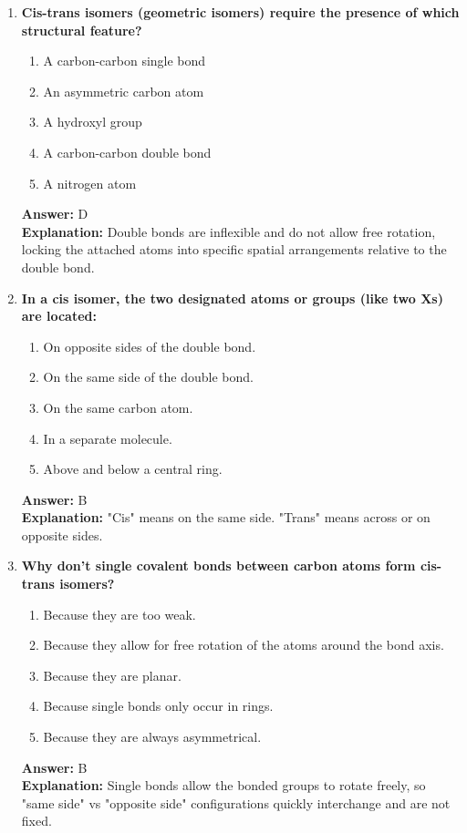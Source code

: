 \documentclass[11pt, a4paper]{article}
\begin{document}
\begin{enumerate}
\item \textbf{Cis-trans isomers (geometric isomers) require the presence of which structural feature?}
\begin{enumerate}[label=\Alph*.]
    \item A carbon-carbon single bond
    \item An asymmetric carbon atom
    \item A hydroxyl group
    \item A carbon-carbon double bond
    \item A nitrogen atom
\end{enumerate}
\textbf{Answer:} D \\
\textbf{Explanation:} Double bonds are inflexible and do not allow free rotation, locking the attached atoms into specific spatial arrangements relative to the double bond.

\item \textbf{In a cis isomer, the two designated atoms or groups (like two Xs) are located:}
\begin{enumerate}[label=\Alph*.]
    \item On opposite sides of the double bond.
    \item On the same side of the double bond.
    \item On the same carbon atom.
    \item In a separate molecule.
    \item Above and below a central ring.
\end{enumerate}
\textbf{Answer:} B \\
\textbf{Explanation:} "Cis" means on the same side. "Trans" means across or on opposite sides.

\item \textbf{Why don't single covalent bonds between carbon atoms form cis-trans isomers?}
\begin{enumerate}[label=\Alph*.]
    \item Because they are too weak.
    \item Because they allow for free rotation of the atoms around the bond axis.
    \item Because they are planar.
    \item Because single bonds only occur in rings.
    \item Because they are always asymmetrical.
\end{enumerate}
\textbf{Answer:} B \\
\textbf{Explanation:} Single bonds allow the bonded groups to rotate freely, so "same side" vs "opposite side" configurations quickly interchange and are not fixed.


\end{enumerate}
\end{document}
